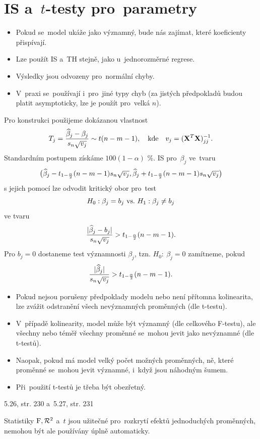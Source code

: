 \section{IS a~$t$-testy pro~parametry}
\begin{itemize}
	\item Pokud se~model ukáže jako významný, bude nás zajímat, které koeficienty přispívají.
	\item Lze použít IS a~TH stejně, jako u~jednorozměrné regrese.
	\item Výsledky jsou odvozeny pro~normální chyby.
	\item V~praxi se~používají i~pro~jiné typy chyb (za jistých předpokladů budou platit asymptoticky, lze je použít pro~velká $n$).
\end{itemize}
Pro konstrukci použijeme dokázanou vlastnost
 $$ T_j = \frac{\widehat{\beta}_j-\beta_j}{s_n\sqrt{v_j}}\sim t(n-m-1),\quad\text{kde}\quad v_j = (\mathbf{X}^T\mathbf{X})_{jj}^{-1}. $$
Standardním postupem získáme $100(1-\alpha)$ \%. IS pro~$\beta_j$ ve~tvaru
 $$ \big(\widehat{\beta}_j-t_{1-\frac{\alpha}{2}}(n-m-1)s_n\sqrt{v_j},\widehat{\beta}_j+t_{1-\frac{\alpha}{2}}(n-m-1)s_n\sqrt{v_j} \big) $$
s jejich pomocí lze odvodit kritický obor pro~test
 $$ H_0: \beta_j = b_j ~\text{vs.}~ H_1: \beta_j\neq b_j $$
ve tvaru
 $$ \frac{|\widehat{\beta}_j-b_j|}{s_n\sqrt{v_j}}>t_{1-\frac{\alpha}{2}}(n-m-1). $$
Pro $b_j = 0$ dostaneme test významnosti $\beta_j$, tzn. $H_0:~\beta_j = 0$ zamítneme, pokud
 $$ \frac{|\widehat{\beta}_j|}{s_n\sqrt{v_j}}>t_{1-\frac{\alpha}{2}}(n-m-1). $$
\begin{remark}
	\begin{itemize}
		\item Pokud nejsou porušeny předpoklady modelu nebo není přítomna kolinearita, lze zvážit odstranění všech nevýznamných proměnných (dle t-testu).
		\item V~případě kolinearity, model může být významný (dle celkového F-testu), ale všechny nebo téměř všechny proměnné se~mohou jevit jako nevýznamné (dle t-testů).
		\item Naopak, pokud má model velký počet možných proměnných, ně, které proměnné se~mohou jevit významné, i~když jsou náhodným šumem.
		\item Při~použití t-testů je třeba být obezřetný.
	\end{itemize}
\end{remark}
\begin{example}
	5.26, str. 230 a~5.27, str. 231
\end{example}
\begin{remark}
	Statistiky $\mathrm{F},\mathcal{R}^2$ a~$t$ jsou užitečné pro~rozkrytí efektů jednoduchých proměnných, nemohou být ale používány úplně automaticky.
\end{remark}

